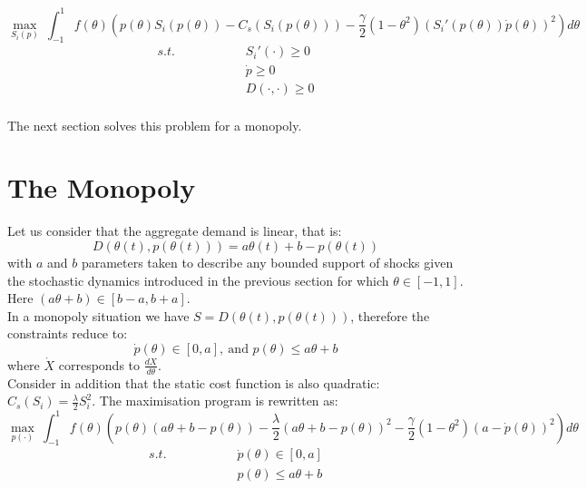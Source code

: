 \begin{equation}
\displaystyle{\max_{S_i(p)}}~\int_{-1}^{1} f(\theta)\left(p(\theta)S_i(p(\theta)) -C_s(S_i(p(\theta)))-\frac{\gamma}{2}(1-\theta^2)\left(S_i'(p(\theta))\dot{p}(\theta)\right)^2\right)d\theta
\end{equation}
\begin{eqnarray} 
s.t.\hspace{2cm}&S_i'(\cdot)\geq0 \nonumber\\
&\dot{p}\geq0\\
&D(\cdot,\cdot)\geq0 \nonumber\\
\end{eqnarray}

The next section solves this problem for a monopoly. 



\section{The Monopoly}\label{monosolve}
Let us consider that the aggregate demand is linear, that is: $$D(\theta(t),p(\theta(t)))=a\theta(t)+b-p(\theta(t))$$
with $a$ and $b$ parameters taken to describe any bounded support of shocks given the stochastic dynamics introduced in the previous section for which $\theta\in[-1,1]$. Here $(a\theta+b)\in[b-a,b+a]$.\\

In a monopoly situation we have $S=D(\theta(t),p(\theta(t)))$, therefore the constraints reduce to: $$\dot{p}(\theta)\in[0,a],~\textrm{and }p(\theta)\leq a\theta+b$$
where $\dot{X}$ corresponds to $\frac{dX}{d\theta}$. \\

Consider in addition that the static cost function is also quadratic: $C_s(S_i)=\frac{\lambda}{2}S_i^2$. The maximisation program is rewritten as: 
\begin{equation}
\displaystyle{\max_{p(\cdot)}}~\int_{-1}^{1} f(\theta)\left(p(\theta)(a\theta+b-p(\theta)) -\frac{\lambda}{2}(a\theta+b-p(\theta))^2-\frac{\gamma}{2}(1-\theta^2)\left(a-\dot{p}(\theta)\right)^2\right)d\theta
\end{equation}
\begin{eqnarray}
s.t.\hspace{2cm}&\dot{p}(\theta)\in[0,a] \nonumber\\
&p(\theta)\leq a\theta+b \nonumber
\end{eqnarray}


